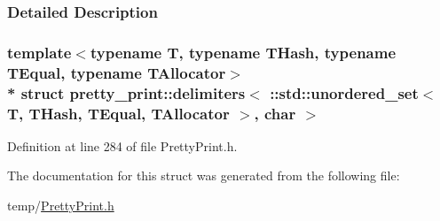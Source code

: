 \subsubsection{Detailed Description}
\subsubsection*{template$<$typename T, typename T\+Hash, typename T\+Equal, typename T\+Allocator$>$\\*
struct pretty\+\_\+print\+::delimiters$<$ \+::std\+::unordered\+\_\+set$<$ T, T\+Hash, T\+Equal, T\+Allocator $>$, char $>$}



Definition at line 284 of file Pretty\+Print.\+h.



The documentation for this struct was generated from the following file\+:\begin{DoxyCompactItemize}
\item 
temp/\hyperlink{PrettyPrint_8h}{Pretty\+Print.\+h}\end{DoxyCompactItemize}
